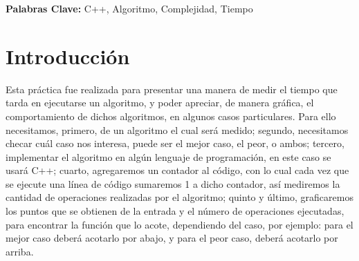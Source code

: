 \documentclass[12pt,twoside]{article}
\begin{document}
{\bf Palabras Clave:} C++, Algoritmo, Complejidad, Tiempo

\section{Introducci\'on}
Esta pr\'actica fue realizada para presentar una manera de medir el tiempo que tarda en ejecutarse un algoritmo, y poder apreciar, de manera gr\'afica, el comportamiento de dichos algoritmos, en algunos casos particulares. Para ello necesitamos, primero, de un algoritmo el cual ser\'a medido; segundo, necesitamos checar cu\'al caso nos interesa, puede ser el mejor caso, el peor, o ambos;
tercero, implementar el algoritmo en alg\'un lenguaje de programaci\'on, en este caso se usar\'a C++; cuarto, agregaremos un contador al c\'odigo, con lo cual cada vez que se ejecute una l\'inea de c\'odigo sumaremos 1 a dicho contador, as\'i mediremos la cantidad de operaciones realizadas por el algoritmo; quinto y \'ultimo, graficaremos los puntos que se obtienen de la entrada y el n\'umero de operaciones ejecutadas, para encontrar la funci\'on que lo acote, dependiendo del caso, por ejemplo: para el mejor caso deber\'a acotarlo por abajo,
y para el peor caso, deber\'a acotarlo por arriba.

\newpage
\end{document}
